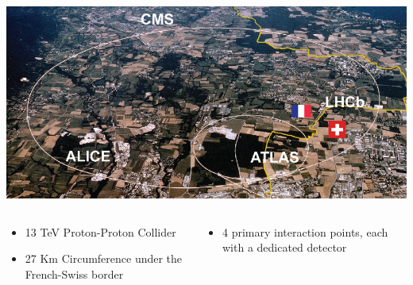\documentclass{beamer}
\newcommand*{\header}[1]{\fontsize{16}{8}\selectfont \textbf{{\color{MyPurple}{#1}}}}
\begin{document}
\begin{frame}
\begin{center}
\header{The Large Hadron Collider}
\end{center}
\begin{center}
\includegraphics[width=1\textwidth]{figures/LHC}
\end{center}
\begin{columns}
\begin{column}{0.5\textwidth}
\begin{itemize}
\small
\item 13 TeV Proton-Proton Collider
\item 27 Km Circumference under the French-Swiss border
\end{itemize}
\end{column}
\begin{column}{0.5\textwidth}
\begin{itemize}
\small
\item 4 primary interaction points, each with a dedicated detector
\end{itemize}
\end{column}
\end{columns}
\end{frame}
\end{document}
